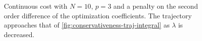 \begin{figure}
    \centering
    
    \caption{Continuous cost with $N=10$, $p=3$ and a penalty on the second order difference of the optimization coefficients. The trajectory approaches that of \cref{fig:conservativeness-traj-integral} as $\lambda$ is decreased.}\label{fig:conservativeness-oscillation-damping}
\end{figure}


